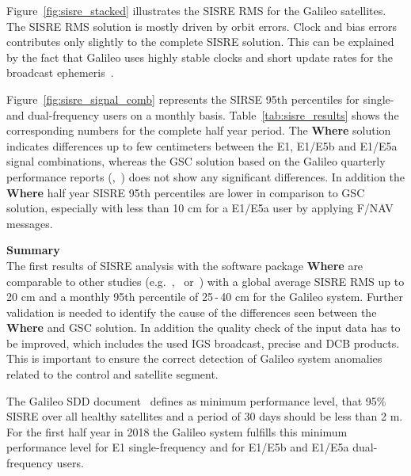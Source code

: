 Figure~\ref{fig:sisre_stacked} illustrates the SISRE RMS for the Galileo satellites. The SISRE RMS solution is mostly driven by orbit errors. Clock and bias errors contributes only slightly to the complete SISRE solution. This can be explained by the fact that Galileo uses highly stable clocks and short update rates for the broadcast ephemeris~\cite{montenbruck2018}.

Figure~\ref{fig:sisre_signal_comb} represents the SIRSE 95th percentiles for single- and dual-frequency users on a monthly basis. Table~\ref{tab:sisre_results} shows the corresponding numbers for the complete half year period. The \textbf{Where} solution indicates differences up to few centimeters between the E1, E1/E5b and E1/E5a signal combinations, whereas the GSC solution based on the Galileo quarterly performance reports (\cite{galileo-is-os-2018-jan},~\cite{galileo-is-os-2018-apr}) does not show any significant differences. In addition the \textbf{Where} half year SISRE 95th percentiles are lower in comparison to GSC solution, especially with less than 10 cm for a E1/E5a user by applying F/NAV messages.


{\large\bfseries Summary}\\
The first results of SISRE analysis with the software package \textbf{Where} are comparable to other studies (e.g.~\cite{galileo-is-os-2018-jan},~\cite{galileo-is-os-2018-apr} or~\cite{montenbruck2018}) with a global average SISRE RMS up to 20 cm and a monthly 95th percentile of 25\,-\,40 cm for the Galileo system. Further validation is needed to identify the cause of the differences seen between the \textbf{Where} and GSC solution. In addition the quality check of the input data has to be improved, which includes the used IGS broadcast, precise and DCB products. This is important to ensure the correct detection of Galileo system anomalies related to the control and satellite segment.

The Galileo SDD document~\cite{galileo-os-sdd} defines as minimum performance level, that 95\% SISRE over all healthy satellites and a period of 30 days should be less than 2 m. For the first half year in 2018 the Galileo system fulfills this minimum performance level for E1 single-frequency and for E1/E5b and E1/E5a dual-frequency users.


\endinput
